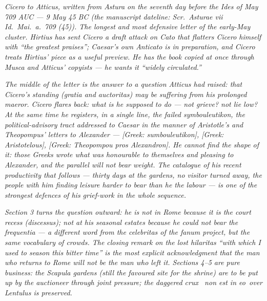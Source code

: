 
\textit{Cicero to Atticus, written from Astura on the
seventh day before the Ides of May 709 AUC --- 9 May
45 BC (the manuscript dateline: \textit{Scr.\ Asturae
vii Id.\ Mai.\ a.\ 709 (45)}). The longest and most
defensive letter of the early-May cluster. Hirtius
has sent Cicero a draft attack on Cato that flatters
Cicero himself with ``the greatest praises''; Caesar's
own \textit{Anticato} is in preparation, and Cicero
treats Hirtius' piece as a useful preview. He has the
book copied at once through Musca and Atticus'
copyists --- he wants it ``widely circulated.''}

\textit{The middle of the letter is the answer to a
question Atticus had raised: that Cicero's standing
(\textit{gratia} and \textit{auctoritas}) may be
suffering from his prolonged \textit{maeror}. Cicero
flares back: what is he supposed to do --- not
grieve? not lie low? At the same time he registers,
in a single line, the failed \textit{symbouleutikon},
the political-advisory tract addressed to Caesar in
the manner of Aristotle's and Theopompus' letters to
Alexander --- \textit{[Greek: sumbouleutikon]},
\textit{[Greek: Aristotelous]}, \textit{[Greek:
Theopompou pros Alexandron]}. He cannot find the
shape of it: those Greeks wrote what was honourable
to themselves and pleasing to Alexander, and the
parallel will not bear weight. The catalogue of his
recent productivity that follows --- thirty days at
the gardens, no visitor turned away, the people with
him finding leisure harder to bear than he the labour
--- is one of the strongest defences of his grief-work
in the whole sequence.}

\textit{Section 3 turns the question outward: he is
not in Rome because it is the court recess
(\textit{discessus}); not at his seasonal estates
because he could not bear the \textit{frequentia} ---
a different word from the \textit{celebritas} of the
\textit{fanum} project, but the same vocabulary of
crowds. The closing remark on the lost
\textit{hilaritas} ``with which I used to season this
bitter time'' is the most explicit acknowledgment
that the man who returns to Rome will not be the man
who left it. Sections 4--5 are pure business: the
Scapula gardens (still the favoured site for the
shrine) are to be put up by the auctioneer through
joint pressure; the daggered crux \dag\ \textit{non est
in eo}\dag\ over Lentulus is preserved.}
